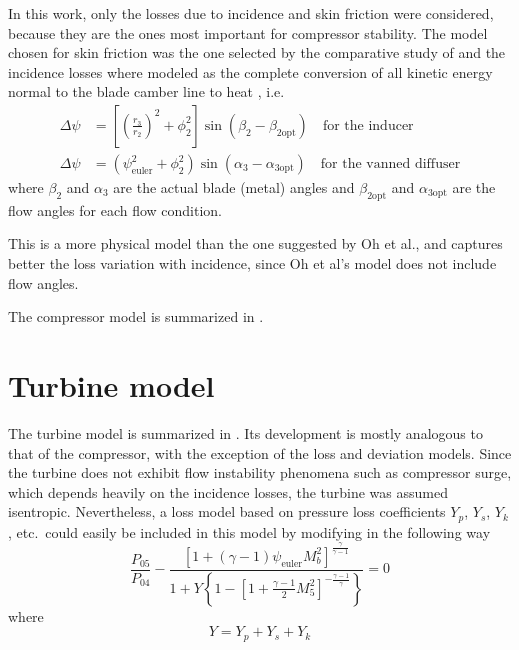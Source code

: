 In this work, only the losses due to incidence and skin friction were considered, because they are the ones most important for compressor stability. The model chosen for skin friction was the one selected by the comparative study of \textcite{Oh1997} and the incidence losses where modeled as the complete conversion of all kinetic energy normal to the blade camber line to heat \cite{Galvas1973}, i.e.\
\begin{align}
    \Delta \psi &= \left[\left(\frac{r_3}{r_2}\right)^2 + \phi_2^2\right]
    \sin(\beta_2 - \beta_{2\text{opt}}) \quad\text{for the inducer} \\
    \Delta \psi &= (\psi_{\text{euler}}^2 + \phi_2^2) \sin(\alpha_3-\alpha_{3\text{opt}}) \quad\text{for the vanned diffuser}
\end{align}
where $\beta_2$ and $\alpha_3$ are the actual blade (metal) angles and $\beta_{2\text{opt}}$ and $\alpha_{3\text{opt}}$ are the flow angles for each flow condition.

This is a more physical model than the one suggested by Oh et al., and captures better the loss variation with incidence, since Oh et al's model does not include flow angles. 

The compressor model is summarized in .

\section{Turbine model}


The turbine model is summarized in . 
Its development is mostly analogous to that of the compressor, with the exception of the loss and deviation models. 
Since the turbine does not exhibit flow instability phenomena such as compressor surge, 
which depends heavily on the incidence losses, 
the turbine was assumed isentropic. 
Nevertheless, a loss model based on pressure loss coefficients $Y_p$, $Y_s$, $Y_k$, etc.\ 
could easily be included in this model by modifying  in the following way
\begin{equation}
    \frac{P_{05}}{P_{04}} -\frac{[1 + (\gamma-1)\psi_{\text{euler}} M_b^2]^{\frac{\gamma}{\gamma-1}}}{1+Y\left\{1-\left[1+\tfrac{\gamma-1}{2}M_5^2\right]^{-\frac{\gamma-1}{\gamma}}\right\}} = 0 
\end{equation}
where
\begin{equation}
    Y = Y_p + Y_s + Y_k
\end{equation}

